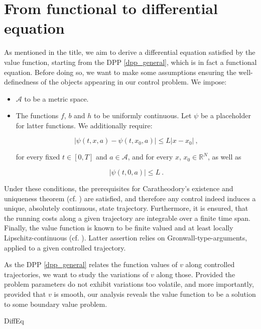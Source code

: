 
\section{From functional to differential equation}

As mentioned in the title, we aim to derive a differential equation satisfied by the value function, starting from the DPP \ref{dpp_general}, which is in fact a functional equation. Before doing so, we want to make some assumptions ensuring the well-definedness of the objects appearing in our control problem. We impose:

	\begin{itemize}
		\item
		$ \mathcal{A} $ to be a metric space.
		
		\item The functions $ f $, $ b $ and $ h $ to be uniformly continuous. Let $ \psi $ be a placeholder for latter functions. We additionally require:
		
		\begin{equation}
			\label{Lipschitz}
			\lvert \psi(t, x, a) - \psi(t, x_0, a) \rvert \leq L \lvert x - x_0 \rvert \ ,
		\end{equation}
		
		for every fixed $ t \in \left[0, T \right] $ and $ a \in \mathcal{A} $, and for every $ x $, $ x_0 \in  \mathbb{R}^N $, as well as 
		
		\begin{equation}
			\label{bounded}
			\lvert \psi(t, 0, a) \rvert \leq L \ .
		\end{equation}
		
	\end{itemize}

Under these conditions, the prerequisites for  Caratheodory's existence and uniqueness theorem (cf. \cite[Theorem 1.45 p.~25]{roubivcek}) are satisfied, and therefore any control indeed induces a unique, absolutely continuous, state trajectory. Furthermore, it is ensured, that the running costs along a given trajectory are integrable over a finite time span. Finally, the value function is known to be finite valued and at least locally Lipschitz-continuous (cf. \cite[Inequality (2.68) from Theorem 2.5 p.~165]{zhou}). Latter assertion relies on Gronwall-type-arguments, applied to a given controlled trajectory.

As the DPP \ref{dpp_general} relates the function values of $ v $ along controlled trajectories, we want to study the variations of $ v $ along those. Provided the problem parameters do not exhibit variations too volatile, and more importantly, provided that $ v $ is smooth, our analysis reveals the value  function to be a solution to some boundary value problem.

	{DiffEq}